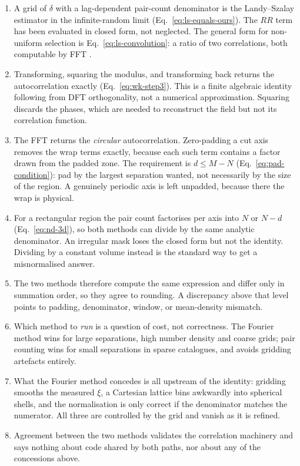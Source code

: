 \documentclass[12pt]{article}
\begin{document}
\begin{enumerate}
  \item A grid of $\delta$ with a lag-dependent pair-count denominator is the
        Landy--Szalay estimator in the infinite-random limit
        (Eq.~\ref{eq:ls-equals-ours}).  The $RR$ term has been evaluated in
        closed form, not neglected.  The general form for non-uniform
        selection is Eq.~\eqref{eq:ls-convolution}: a ratio of two
        correlations, both computable by FFT \citep{Slepian2016}.
  \item Transforming, squaring the modulus, and transforming back returns the
        autocorrelation exactly (Eq.~\ref{eq:wk-step3}).  This is a finite
        algebraic identity following from DFT orthogonality, not a numerical
        approximation.  Squaring discards the phases, which are needed to
        reconstruct the field but not its correlation function.
  \item The FFT returns the \emph{circular} autocorrelation.  Zero-padding a
        cut axis removes the wrap terms exactly, because each such term
        contains a factor drawn from the padded zone.  The requirement is
        $d \le M-N$ (Eq.~\ref{eq:pad-condition}): pad by the largest
        separation wanted, not necessarily by the size of the region.  A
        genuinely periodic axis is left unpadded, because there the wrap is
        physical.
  \item For a rectangular region the pair count factorises per axis into
        $N$ or $N-d$ (Eq.~\ref{eq:nd-3d}), so both methods can divide by the
        same analytic denominator.  An irregular mask loses the closed form
        but not the identity.  Dividing by a constant volume instead is the
        standard way to get a misnormalised answer.
  \item The two methods therefore compute the same expression and differ only
        in summation order, so they agree to rounding.  A discrepancy above
        that level points to padding, denominator, window, or mean-density
        mismatch.
  \item Which method to \emph{run} is a question of cost, not correctness.
        The Fourier method wins for large separations, high number density and
        coarse grids; pair counting wins for small separations in sparse
        catalogues, and avoids gridding artefacts entirely.
  \item What the Fourier method concedes is all upstream of the identity:
        gridding smooths the measured $\xi$, a Cartesian lattice bins
        awkwardly into spherical shells, and the normalisation is only
        correct if the denominator matches the numerator.  All three are
        controlled by the grid and vanish as it is refined.
  \item Agreement between the two methods validates the correlation
        machinery and says nothing about code shared by both paths, nor
        about any of the concessions above.
\end{enumerate}


\end{document}
